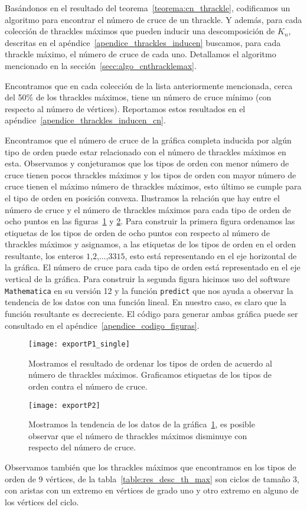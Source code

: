     Basándonos en el resultado del teorema~\ref{teorema:cn_thrackle}, codificamos un
    algoritmo para encontrar el número de cruce de un thrackle. Y además, para cada colección de
    thrackles máximos que pueden inducir una descomposición de $K_n$, descritas en el
    apéndice~\ref{apendice_thrackles_inducen} buscamos, para cada thrackle máximo, el número
    de cruce de cada uno. Detallamos el algoritmo mencionado en la
    sección~\ref{secc:algo_cnthracklemax}.

    Encontramos que en cada colección de la lista anteriormente mencionada, cerca del 50\% de los
    thrackles máximos, tiene un número de cruce mínimo (con respecto al número de vértices).
    Reportamos estos resultados en el apéndice~\ref{apendice_thrackles_inducen_cn}.

    Encontramos que el número de cruce de la gráfica completa inducida por algún tipo de orden
    puede estar relacionado con el número de thrackles máximos en esta. Observamos y conjeturamos
    que los tipos de orden con menor número de cruce tienen pocos thrackles máximos y los tipos de
    orden con mayor número de cruce tienen el máximo número de thrackles máximos, esto último se
    cumple para el tipo de orden en posición convexa. Ilustramos la relación
    que hay entre el número de cruce y el número de thrackles máximos para cada tipo de orden de
    ocho puntos en las figuras~\ref{fig:cnk8} y \ref{fig:cnk8_2}. Para construir la primera figura
    ordenamos las etiquetas de los tipos de orden de ocho puntos con respecto al número de thrackles
    máximos y asignamos, a las etiquetas de los tipos de orden en el orden resultante, los enteros
    $1$,$2$,$\dots$,$3315$, esto está representando en el eje horizontal de la gráfica. El número de
    cruce para cada tipo de orden está representado en el eje vertical de la gráfica. Para construir
    la segunda figura hicimos uso del software \texttt{Mathematica} en su versión 12 y la función
    \texttt{predict} que nos ayuda a observar la tendencia de los datos con una función lineal. En nuestro caso, es claro que la función resultante es decreciente. El código para generar ambas gráfica puede ser consultado en el apéndice~\ref{apendice_codigo_figuras}.
    \begin{figure}
      \centering
      \texttt{[image: exportP1\_single]}
      \caption{Mostramos el resultado de ordenar los tipos de orden de acuerdo al número de thrackles máximos. Graficamos etiquetas de los tipos de orden contra el número de cruce.}
      \label{fig:cnk8}
    \end{figure}
    \begin{figure}
      \centering
      \texttt{[image: exportP2]}
      \caption{Mostramos la tendencia de los datos de la gráfica~\ref{fig:cnk8}, es posible observar que el número de thrackles máximos disminuye con respecto del número de cruce.}
      \label{fig:cnk8_2}
    \end{figure}
    Observamos también que los thrackles máximos que encontramos en los tipos de orden de 9
    vértices, de la tabla~\ref{table:res_desc_th_max} son ciclos de tamaño 3, con aristas con un
    extremo en vértices de grado uno y otro extremo en alguno de los vértices del ciclo.

